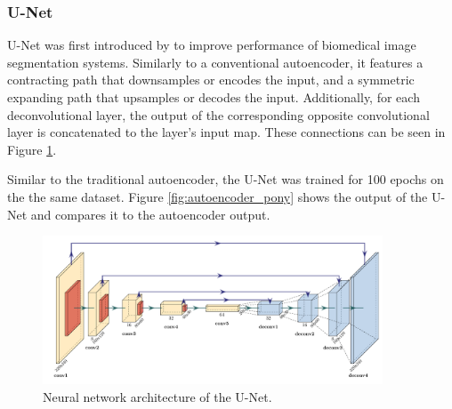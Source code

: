 \documentclass{l4proj}
\begin{document}
\subsubsection{U-Net}

U-Net was first introduced by \citet{ronneberger_u-net_2015} to improve performance of biomedical image segmentation systems. Similarly to a conventional autoencoder, it features a contracting path that downsamples or encodes the input, and a symmetric expanding path that upsamples or decodes the input. Additionally, for each deconvolutional layer, the output of the corresponding opposite convolutional layer is concatenated to the layer's input map. These connections can be seen in Figure \ref{fig:unet_architecture}. 

Similar to the traditional autoencoder, the U-Net was trained for 100 epochs on the the same dataset. Figure \ref{fig:autoencoder_pony} shows the output of the U-Net and compares it to the autoencoder output.



\begin{figure}[ht]
  \centering
  \includegraphics[width=0.9\textwidth]{images/unet/unet}
  \caption{Neural network architecture of the U-Net.}
  \label{fig:unet_architecture}
\end{figure}
\end{document}
